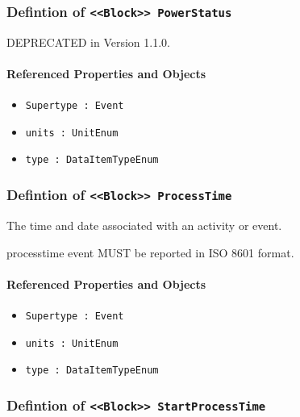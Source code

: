\subsubsection{Defintion of \texttt{<<Block>> PowerStatus}}
  \label{type:PowerStatus}

\FloatBarrier

DEPRECATED in Version 1.1.0.

\FloatBarrier
\paragraph{Referenced Properties and Objects}

\begin{itemize}
\item \texttt{Supertype : Event}

\item \texttt{units : UnitEnum}

\item \texttt{type : DataItemTypeEnum}

\end{itemize}
\FloatBarrier
\subsubsection{Defintion of \texttt{<<Block>> ProcessTime}}
  \label{type:ProcessTime}

\FloatBarrier

The time and date associated with an activity or event.
  
 processtime event MUST be reported in ISO 8601 format.

\FloatBarrier
\paragraph{Referenced Properties and Objects}

\begin{itemize}
\item \texttt{Supertype : Event}

\item \texttt{units : UnitEnum}

\item \texttt{type : DataItemTypeEnum}

\end{itemize}
\FloatBarrier
\subsubsection{Defintion of \texttt{<<Block>> StartProcessTime}}
  \label{type:StartProcessTime}

